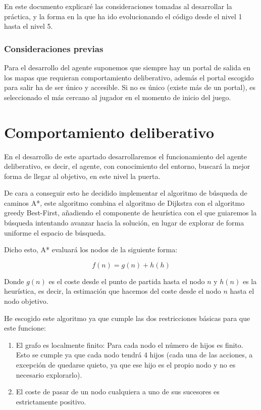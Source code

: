 \documentclass[10pt, spanish]{article}
\begin{document}
En este documento explicaré las consideraciones tomadas al desarrollar la práctica, y la forma en la que ha ido evolucionando el código desde el nivel 1 hasta el nivel 5.

\subsubsection{Consideraciones previas}

Para el desarrollo del agente suponemos que siempre hay un portal de salida en los mapas que requieran comportamiento deliberativo, además el portal escogido para salir ha de ser único y accesible. Si no es único (existe más de un portal), es seleccionado el más cercano al jugador en el momento de inicio del juego.

\section{Comportamiento deliberativo}

En el desarrollo de este apartado desarrollaremos el funcionamiento del agente deliberativo, es decir, el agente, con conocimiento del entorno, buscará la mejor forma de llegar al objetivo, en este nivel la puerta.

De cara a conseguir esto he decidido implementar el algoritmo de búsqueda de caminos A*, este algoritmo combina el algoritmo de Dijkstra con el algoritmo greedy Best-First, añadiendo el componente de heurística con el que guiaremos la búsqueda intentando avanzar hacia la solución, en lugar de explorar de forma uniforme el espacio de búsqueda.

Dicho esto, A* evaluará los nodos de la siguiente forma:

$$ f(n) = g(n) + h(h) $$

Donde $g(n)$ es el coste desde el punto de partida hasta el nodo $n$ y $h(n)$ es la heurística, es decir, la estimación que hacemos del coste desde el nodo $n$ hasta el nodo objetivo.

He escogido este algoritmo ya que cumple las dos restricciones básicas para que este funcione:

\begin{enumerate}
	\item El grafo es localmente finito: Para cada nodo el número de hijos es finito. Esto se cumple ya que cada nodo tendrá 4 hijos (cada una de las acciones, a excepción de quedarse quieto, ya que ese hijo es el propio nodo y no es necesario explorarlo).
	\item El coste de pasar de un nodo cualquiera a uno de sus sucesores es estrictamente positivo.
\end{enumerate}
\end{document}
